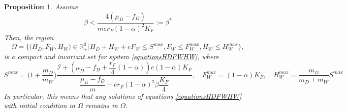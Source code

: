 \documentclass{article}
\newcommand{\cI}{\mathcal{I}}
\newtheorem{prop}{Proposition}
\begin{document}
\begin{prop}\label{invariantRegion} 
Assume 
\begin{equation*}
\beta < \dfrac{4(\mu_D - f_D)}{m e r_F (1-\alpha)^2 K_F} := \beta^*
\end{equation*}
Then, the region
$$\Omega = \Big\{\Big(H_D, F_W, H_W \Big) \in \mathbb{R}_+^3  \Big|H_D + H_W + eF_W \leq S^{max}, F_W \leq F_W^{max}, H_W \leq H_W^{max} \Big\},$$
is a compact and invariant set for system \eqref{equationsHDFWHW}, 
where
$$
S^{max} = \Big(1 + \dfrac{m_D}{m_W} \Big) \dfrac{\cI + \left(\mu_D - f_D + \dfrac{r_F}{4}(1-\alpha) \right) e (1-\alpha)K_F }{\dfrac{\mu_D - f_D}{m} - er_F (1-\alpha)^2 \beta \dfrac{K_F}{4}},
\quad
F_W^{max} = (1-\alpha)K_F,
\quad
H_W^{max} = \dfrac{m_D}{m_D + m_W} S^{max}
$$
In particular, this means that any solutions of equations \eqref{equationsHDFWHW} with initial condition in $\Omega$ remains in $\Omega$.
\end{prop}
%
\end{document}
